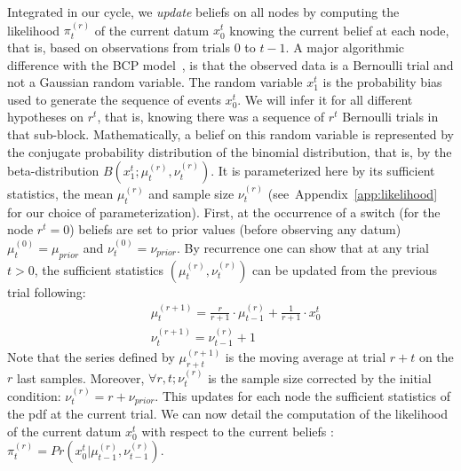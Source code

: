 \documentclass[12pt,english]{article}%
\newcommand{\eqa}[1]{\begin{align}#1\end{align}}
\newcommand{\citep}[1]{\parencite{#1}}
\newcommand{\seeFig}[1]{Figure~\ref{fig:#1}}
\newcommand{\seeEq}[1]{Equation~\ref{eq:#1}}
\newcommand{\seeApp}[1]{Appendix~\ref{app:#1}}
\begin{document}
Integrated in our cycle, we \emph{update} beliefs on all nodes
by computing the likelihood $\pi^{(r)}_t$ of the current datum $x_0^{t}$
knowing the current belief at each node,
that is, based on observations from trials $0$ to $t-1$. %
A major algorithmic difference with the BCP model~\citep{AdamsMackay2007},
is that the observed data is a Bernoulli trial and not a Gaussian random variable.
The random variable $x_1^t$ is the probability bias used
to generate the sequence of events $x_0^t$.
We will infer it for all different hypotheses on $r^t$,
that is, knowing there was a sequence of $r^t$ Bernoulli trials in that sub-block.
Mathematically, a belief on this random variable is represented
by the conjugate probability distribution of the binomial distribution,
that is, by the beta-distribution $B(x_1^t; \mu^{(r)}_{t}, \nu^{(r)}_{t})$.
It is parameterized here by its sufficient statistics,
the mean $\mu^{(r)}_{t}$ and sample size $\nu^{(r)}_{t}$ %
(see~\seeApp{likelihood} for our choice of parameterization).
First, at the occurrence of a switch (for the node $r^t=0$)
beliefs are set to prior values (before observing any datum)
$\mu^{(0)}_{t} = \mu_{prior}$ and $\nu^{(0)}_{t} = \nu_{prior}$.
By recurrence %
one can show that at any trial $t>0$,
the sufficient statistics $(\mu^{(r)}_{t}, \nu^{(r)}_{t})$
can be updated from the previous trial following:
\eqa{
& \mu^{(r+1)}_{t} = \frac{r}{r+1} \cdot \mu^{(r)}_{t-1} + \frac{1}{r+1} \cdot x_0^{t} \\
& \nu^{(r+1)}_{t} = \nu^{(r)}_{t-1} + 1
}
Note that the series defined by $\mu^{(r+1)}_{r+t}$ is the moving average at trial $r+t$ on the $r$ last samples.
Moreover, $\forall r, t; \nu^{(r)}_{t}$ is the sample size corrected by the initial condition:
$\nu^{(r)}_{t} = r + \nu_{prior}$.
This updates for each node the sufficient statistics of the pdf at the current trial.
We can now detail the computation of the likelihood of the current datum $x_0^{t}$ with respect to
the current beliefs : $\pi^{(r)}_t = Pr( x_0^{t} |  \mu^{(r)}_{t-1}, \nu^{(r)}_{t-1})$. %
\end{document}

